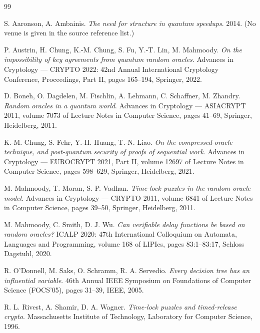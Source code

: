 \documentclass{conjura-conjecture}
\begin{document}
\begin{conjurabibliography}{99}

S. Aaronson, A. Ambainis.
\emph{The need for structure in quantum speedups}.
2014. (No venue is given in the source reference list.)

P. Austrin, H. Chung, K.-M. Chung, S. Fu, Y.-T. Lin, M. Mahmoody.
\emph{On the impossibility of key agreements from quantum random oracles}.
Advances in Cryptology --- CRYPTO 2022: 42nd Annual International
Cryptology Conference, Proceedings, Part II, pages 165--194, Springer,
2022.

D. Boneh, O. Dagdelen, M. Fischlin, A. Lehmann, C. Schaffner, M. Zhandry.
\emph{Random oracles in a quantum world}.
Advances in Cryptology --- ASIACRYPT 2011, volume 7073 of Lecture Notes in
Computer Science, pages 41--69, Springer, Heidelberg, 2011.

K.-M. Chung, S. Fehr, Y.-H. Huang, T.-N. Liao.
\emph{On the compressed-oracle technique, and post-quantum security of
proofs of sequential work}.
Advances in Cryptology --- EUROCRYPT 2021, Part II, volume 12697 of Lecture
Notes in Computer Science, pages 598--629, Springer, Heidelberg, 2021.

M. Mahmoody, T. Moran, S. P. Vadhan.
\emph{Time-lock puzzles in the random oracle model}.
Advances in Cryptology --- CRYPTO 2011, volume 6841 of Lecture Notes in
Computer Science, pages 39--50, Springer, Heidelberg, 2011.

M. Mahmoody, C. Smith, D. J. Wu.
\emph{Can verifiable delay functions be based on random oracles?}
ICALP 2020: 47th International Colloquium on Automata, Languages and
Programming, volume 168 of LIPIcs, pages 83:1--83:17, Schloss Dagstuhl,
2020.

R. O'Donnell, M. Saks, O. Schramm, R. A. Servedio.
\emph{Every decision tree has an influential variable}.
46th Annual IEEE Symposium on Foundations of Computer Science (FOCS'05),
pages 31--39, IEEE, 2005.

R. L. Rivest, A. Shamir, D. A. Wagner.
\emph{Time-lock puzzles and timed-release crypto}.
Massachusetts Institute of Technology, Laboratory for Computer Science,
1996.

\end{conjurabibliography}
\end{document}
